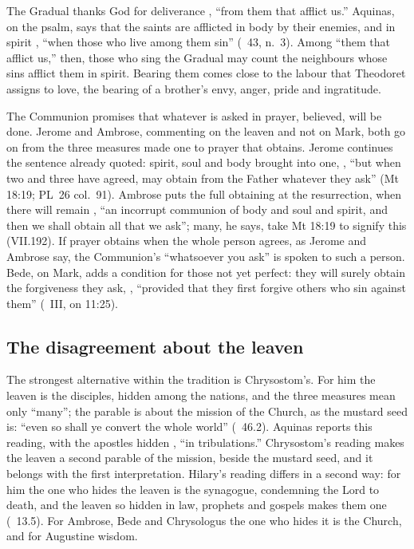 The Gradual thanks God for deliverance , ``from
them that afflict us.'' Aquinas, on the psalm, says that the saints are
afflicted in body by their enemies, and in spirit , ``when those who live among them sin'' (~43, n.~3). Among ``them that afflict us,'' then, those who sing the
Gradual may count the neighbours whose sins afflict them in spirit. Bearing
them comes close to the labour that Theodoret assigns to love, the bearing of
a brother's envy, anger, pride and ingratitude.

The Communion promises that whatever is asked in prayer, believed, will be
done. Jerome and Ambrose, commenting on the leaven and not on Mark, both go
on from the three measures made one to prayer that obtains. Jerome continues the
sentence already quoted: spirit, soul and body brought into one, ,
``but when two and three have agreed, may obtain from the Father whatever they
ask'' (Mt 18:19; PL~26 col.~91). Ambrose puts the full obtaining at the
resurrection, when there will remain , ``an
incorrupt communion of body and soul and spirit, and then we shall obtain all
that we ask''; many, he says, take Mt 18:19 to signify this (VII.192). If
prayer obtains when the whole person agrees, as Jerome and Ambrose say, the
Communion's ``whatsoever you ask'' is spoken to such a person. Bede, on Mark,
adds a condition for those not yet perfect:
they will surely obtain the forgiveness they ask, , ``provided that they first forgive
others who sin against them'' (~III, on 11:25).

\subsection{The disagreement about the leaven}
\label{sec:leaven-alternative}

The strongest alternative within the tradition is Chrysostom's. For him the
leaven is the disciples, hidden among the nations, and the three measures mean
only ``many''; the parable is about the mission of the Church, as the mustard
seed is: ``even so shall ye convert the whole world'' (~46.2). Aquinas reports this reading, with the apostles hidden , ``in tribulations.'' Chrysostom's reading makes the
leaven a second parable of the mission, beside the mustard seed, and it
belongs with the first interpretation. Hilary's reading differs in a second
way: for him the one who hides the leaven is the synagogue, condemning the
Lord to death, and the leaven so hidden in law, prophets and gospels makes
them one (~13.5). For Ambrose, Bede and Chrysologus the one
who hides it is the Church, and for Augustine wisdom.


